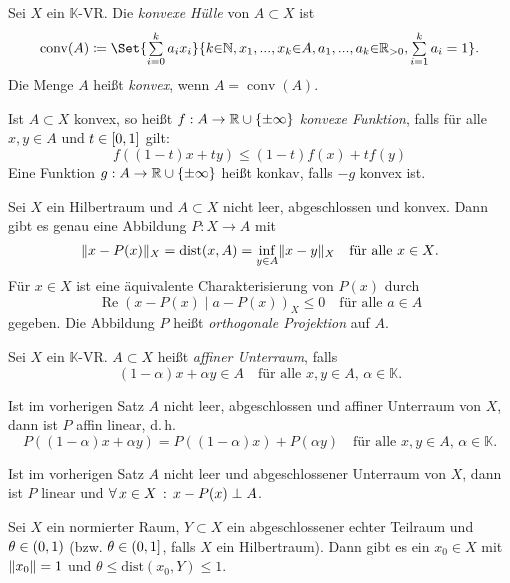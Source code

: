 \documentclass{cheat-sheet}
\newcommand{\K}{\mathbb{K}}
\newcommand{\dist}{\mathrm{dist}} %
\newcommand{\scp}[2]{\left( #1 \!\mid\! #2 \right)} %
\newcommand{\conv}{\mathop{\mathrm{conv}}} %
\renewcommand{\Re}{\operatorname{Re}} %
\begin{document}

\begin{defn}
  Sei $X$ ein $\K$-VR. Die \emph{konvexe Hülle} von $A \subset X$ ist
  \[ \conv(A) \coloneqq \Set{ \sum_{i=0}^k a_i x_i }{ k {\in} \N, x_1, ..., x_k {\in} A, a_1, ..., a_k {\in} \R_{> 0}, \sum_{i=1}^k a_i = 1 }. \]
  Die Menge $A$ heißt \emph{konvex}, wenn $A = \conv(A)$.
\end{defn}

\begin{defn}
  Ist $A \subset X$ konvex, so heißt $f : A \to \mathbb{R} \cup \{ \pm\infty \}$ \emph{konvexe Funktion}, falls für alle $x, y \in A$ und $t \in \left[ 0, 1 \right]$ gilt:
  \[ f((1{-}t)x + t y) \leq (1-t) f(x) + t f(y) \]
  Eine Funktion $g : A \to \mathbb{R} \cup \{ \pm \infty \}$ heißt konkav, falls $-g$ konvex ist.
\end{defn}

\begin{satz}
  Sei $X$ ein Hilbertraum und $A \subset X$ nicht leer, abgeschlossen und konvex. Dann gibt es genau eine Abbildung $P : X \to A$ mit
  \[ \norm{x - P(x)}_X = \dist(x, A) = \inf_{y \in A} \norm{x - y}_X \quad \text{für alle $x \in X$.} \]
  Für $x \in X$ ist eine äquivalente Charakterisierung von $P(x)$ durch
  \[ \Re \scp{x-P(x)}{a-P(x)}_X \leq 0 \quad \text{für alle $a \in A$} \]
  gegeben. Die Abbildung $P$ heißt \emph{orthogonale Projektion} auf $A$.
\end{satz}

\begin{defn}
  Sei $X$ ein $\K$-VR. $A \subset X$ heißt \emph{affiner Unterraum}, falls
  \[ (1{-}\alpha) x + \alpha y \in A \quad \text{für alle $x, y \in A$, $\alpha \in \K$.} \]
\end{defn}

\begin{satz}
  Ist im vorherigen Satz $A$ nicht leer, abgeschlossen und affiner Unterraum von $X$, dann ist $P$ affin linear, d.\,h.
  \[ P\left( (1{-}\alpha) x + \alpha y \right) = P \left( (1{-}\alpha) x \right) + P \left( \alpha y \right) \quad \text{für alle $x, y \in A$, $\alpha \in \K$.} \]
\end{satz}

\begin{satz}
  Ist im vorherigen Satz $A$ nicht leer und abgeschlossener Unterraum von $X$, dann ist $P$ linear und $\forall \, {x \in X} \,:\, x - P(x) \perp A$.
\end{satz}

\begin{satz}
  Sei $X$ ein normierter Raum, $Y \subset X$ ein abgeschlossener echter Teilraum und $\theta \in \left( 0, 1 \right)$ (bzw. $\theta \in \left( 0, 1 \right]$, falls $X$ ein Hilbertraum). Dann gibt es ein $x_0 \in X$ mit $\lVert x_0\rVert = 1$ und $\theta \leq \dist(x_0, Y) \leq 1$.
\end{satz}
\end{document}
